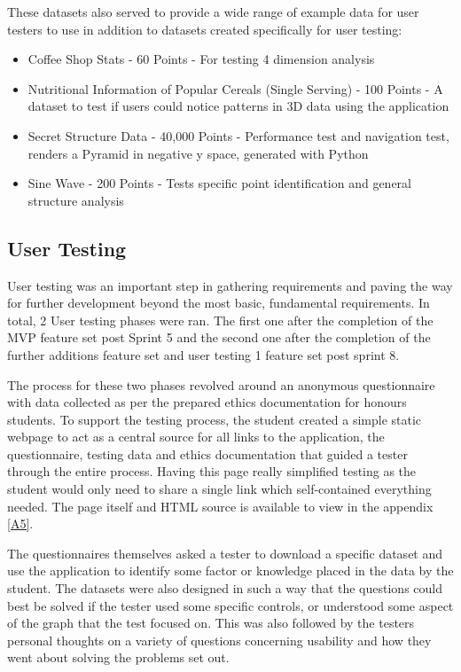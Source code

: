 These datasets also served to provide a wide range of example data for user testers to use in addition to datasets created specifically for user testing:
\begin{itemize}
    \item Coffee Shop Stats - 60 Points - For testing 4 dimension analysis
    \item Nutritional Information of Popular Cereals (Single Serving) - 100 Points - A dataset to test if users could notice patterns in 3D data using the application
    \item Secret Structure Data - 40,000 Points - Performance test and navigation test, renders a Pyramid in negative y space, generated with Python
    \item Sine Wave - 200 Points - Tests specific point identification and general structure analysis
\end{itemize}

\subsection{User Testing} \label{usertest1}
User testing was an important step in gathering requirements and paving the way for further development beyond the most basic, fundamental requirements. In total, 2 User testing phases were ran. The first one after the completion of the MVP feature set post Sprint 5 and the second one after the completion of the further additions feature set and user testing 1 feature set post sprint 8.

The process for these two phases revolved around an anonymous questionnaire with data collected as per the prepared ethics documentation for honours students.
To support the testing process, the student created a simple static webpage to act as a central source for all links to the application, the questionnaire, testing data and ethics documentation that guided a tester through the entire process. Having this page really simplified testing as the student would only need to share a single link which self-contained everything needed. The page itself and HTML source is available to view in the appendix \ref{A5}.

The questionnaires themselves asked a tester to download a specific dataset and use the application to identify some factor or knowledge placed in the data by the student. The datasets were also designed in such a way that the questions could best be solved if the tester used some specific controls, or understood some aspect of the graph that the test focused on. This was also followed by the testers personal thoughts on a variety of questions concerning usability and how they went about solving the problems set out.

